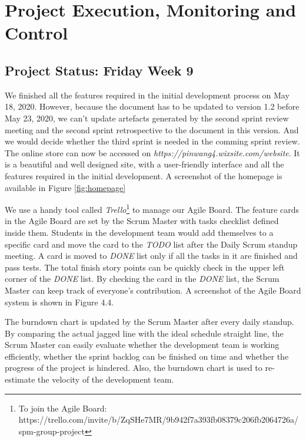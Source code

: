 \documentclass{report}
\begin{document}
\chapter{Project Execution, Monitoring and Control}
\label{chap:pe}
\section{Project Status: Friday Week 9}
\label{sec:ps1}
We finished all the features required in the initial development process on May 18, 2020. However, because the document has to be updated to version 1.2 before May 23, 2020, we can’t update artefacts generated by the second sprint review meeting and the second sprint retrospective to the document in this version. And we would decide whether the third sprint is needed in the comming sprint review. The online store can now be accessed on \textit{https://pinwang4.wixsite.com/website}. It is a beautiful and well designed site, with a user-friendly interface and all the features required in the initial development. A screenshot of the homepage is available in Figure \ref{fig:homepage}

We use a handy tool called \textit{Trello}\footnote{To join the Agile Board: https://trello.com/invite/b/ZqSHe7MR/9b942f7a393fb08379c206fb2064726a/spm-group-project} to manage our Agile Board. The feature cards in the Agile Board are set by the Scrum Master with tasks checklist defined inside them. Students in the development team would add themselves to a specific card and move the card to the \textit{TODO} list after the Daily Scrum standup meeting. A card is moved to \textit{DONE} list only if all the tasks in it are finished and pass tests. The total finish story points can be quickly check in the upper left corner of the \textit{DONE} list. By checking the card in the \textit{DONE} list, the Scrum Master can keep track of everyone’s contribution. A screenshot of the Agile Board system is shown in Figure 4.4.

The burndown chart is updated by the Scrum Master after every daily standup. By comparing the actual jagged line with the ideal schedule straight line, the Scrum Master can easily evaluate whether the development team is working efficiently, whether the sprint backlog can be finished on time and whether the progress of the project is hindered. Also, the burndown chart is used to re-estimate the velocity of the development team. 
\end{document}
